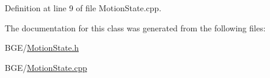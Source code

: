 Definition at line 9 of file Motion\-State.\-cpp.



The documentation for this class was generated from the following files\-:\begin{DoxyCompactItemize}
\item 
B\-G\-E/\hyperlink{_motion_state_8h}{Motion\-State.\-h}\item 
B\-G\-E/\hyperlink{_motion_state_8cpp}{Motion\-State.\-cpp}\end{DoxyCompactItemize}
